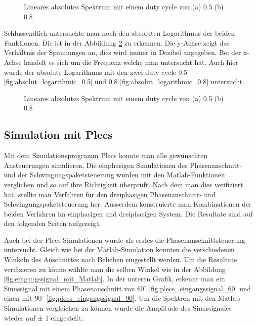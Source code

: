 \begin{figure}[ht!]
	\centering
	\qquad
	\caption{Lineares absolutes Spektrum mit einem duty cycle von (a) 0.5 (b) 0.8}
	\label{fig:Schwingungspaketspektrum Matlab}
\end{figure}

Schlussendlich untersuchte man noch den absoluten Logarithmus der beiden Funktionen. Die ist in der Abbildung \ref{fig:absolut_logaritmic_matlab} zu erkennen. Die y-Achse zeigt das Verhältnis der Spannungen an, dies wird immer in Dezibel angegeben. Bei der x-Achse handelt es sich um die Frequenz welche man untersucht hat. Auch hier wurde der absolute Logarithmus mit den zwei duty cycle 0.5 \ref{fig:absolut_logarithmic_0.5} und 0.8 \ref{fig:absolut_logarithmic_0.8} untersucht.


\begin{figure}[ht!]
	\centering
	\qquad
	\caption{Lineares absolutes Spektrum mit einem duty cycle von (a) 0.5 (b) 0.8}
	\label{fig:absolut_logaritmic_matlab}
\end{figure}
\newpage
\subsection{Simulation mit Plecs}

Mit dem Simulationsprogramm Plecs konnte man alle gewünschten Ansteuerungen simulieren. Die einphasigen Simulationen der Phasenanschnitt- und der Schwingungspaketsteuerung wurden mit den Matlab-Funktionen verglichen und so auf ihre Richtigkeit überprüft. Nach dem man dies verifiziert hat, stellte man Verfahren für den dreiphasigen Phasenanschnitt- und Schwingungspaketsteuerung her. Ausserdem konstruierte man Kombinationen der beiden Verfahren im einphasigen und dreiphasigen System. Die Resultate sind auf den folgenden Seiten aufgezeigt.

\newpage

Auch bei der Plecs-Simulationen wurde als erstes die Phasenanschnittsteuerung untersucht. Gleich wie bei der Matlab-Simulation konnten die verschiedenen Winkeln des Anschnittes nach Belieben eingestellt werden. Um die Resultate verifizieren zu könne wählte man die selben Winkel wie in der Abbildung \ref{fig:eingangssignal_mit_Matlab}. In der unteren Grafik, erkennt man ein Sinussignal mit einem Phasenanschnitt von $60^\circ$ \ref{fig:plecs_eingangssignal_60} und einen mit $90^\circ$ \ref{fig:plecs_eingangssignal_90}. Um die Spektren mit den Matlab-Simulationen vergleichen zu können wurde die Amplitude des Sinussignales wieder auf ± 1 eingestellt. 

